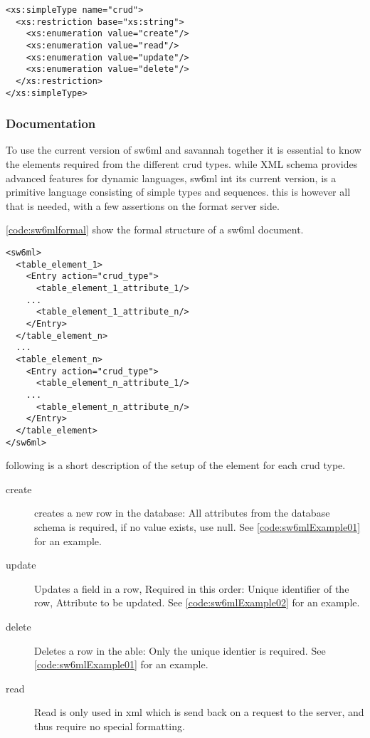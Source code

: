 \begin{lstlisting}[label=code:sw6mlCrud,caption=sw6ml crud simple type]
 <xs:simpleType name="crud">
  <xs:restriction base="xs:string">
    <xs:enumeration value="create"/>
    <xs:enumeration value="read"/>
    <xs:enumeration value="update"/>
    <xs:enumeration value="delete"/>
  </xs:restriction>
</xs:simpleType>
\end{lstlisting}

\subsubsection{Documentation}
\label{sw6mlusage}
To use the current version of sw6ml and savannah together it is essential to know the elements required from the different crud types.
while XML schema provides advanced features for dynamic languages, sw6ml int its current version, is a primitive language consisting of simple types and sequences.
this is however all that is needed, with a few assertions on the format server side.

\autoref{code:sw6mlformal} show the formal structure of a sw6ml document.
\begin{lstlisting}[label=code:sw6mlformal,caption=root and table elements]
<sw6ml> 
  <table_element_1>
    <Entry action="crud_type">
      <table_element_1_attribute_1/>
	...
      <table_element_1_attribute_n/>
    </Entry>
  </table_element_n>
  ...
  <table_element_n>
    <Entry action="crud_type">
      <table_element_n_attribute_1/>
	...
      <table_element_n_attribute_n/>
    </Entry>
  </table_element>
</sw6ml>
\end{lstlisting}

following is a short description of the setup of the  element for each crud type.

\begin{description}
 \item[create] creates a new row in the database: All attributes from the database schema is required, if no value exists, use null. See \autoref{code:sw6mlExample01} for an example.
 \item[update] Updates a field in a row, Required in this order: Unique identifier of the row, Attribute to be updated. See \autoref{code:sw6mlExample02} for an example.
 \item[delete] Deletes a row in the able: Only the unique identier is required. See \autoref{code:sw6mlExample01} for an example.
 \item[read]   Read is only used in xml which is send back on a request to the server, and thus require no special formatting.
\end{description}


